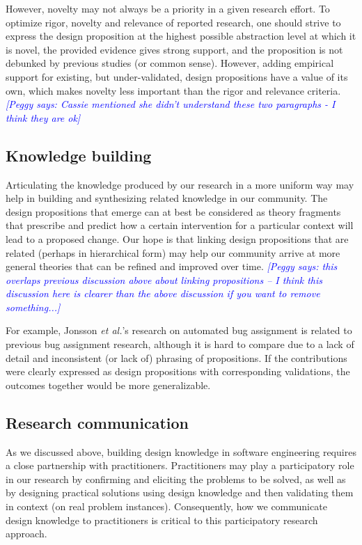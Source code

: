 \documentclass[graybox]{svmult}
\newcommand{\peggy}[1]{\textcolor{blue}{{\it [Peggy says: #1]}}}
\newcommand{\peggy}[1]{}
\begin{document}
However, novelty may not always be a priority in a given research effort.
To optimize rigor, novelty and relevance of reported research, one should strive to express the design proposition at the highest possible abstraction level at which it is novel, the provided evidence gives strong support, and the proposition is not debunked by previous studies (or common sense). However, adding empirical support for existing, but under-validated, design propositions have a value of its own, which makes novelty less important than the rigor and relevance criteria.\peggy{Cassie mentioned she didn't understand these two paragraphs - I think they are ok}


\subsection{Knowledge building}
\label{sec:knowledge}

Articulating the knowledge produced by our research in a more uniform way may help in building and synthesizing related knowledge in our community. 
The design propositions that emerge can at best be considered as theory fragments that prescribe and predict how a certain intervention for a particular context will lead to a proposed change. 
Our hope is that linking design propositions that are related (perhaps in hierarchical form) may help our community arrive at more general theories that can be refined and improved over time.
\peggy{this overlaps previous discussion above about linking propositions -- I think this discussion here is clearer than the above discussion if you want to remove something...}

For example, Jonsson \emph{et al.}'s research on automated bug assignment is related to previous bug assignment research, although it is hard to compare due to a lack of detail and inconsistent (or lack of) phrasing of propositions. If the contributions were clearly expressed as design propositions with corresponding validations, the outcomes together would be more generalizable.



\subsection{Research communication}
\label{sec:communication}

As we discussed above, building design knowledge in software engineering requires a close partnership with practitioners. 
Practitioners may play a participatory role in our research by confirming and eliciting the problems to be solved, as well as by designing practical solutions using design knowledge and then validating them in context (on real problem instances). 
Consequently, how we communicate design knowledge to practitioners is critical to this participatory research approach.
\end{document}
